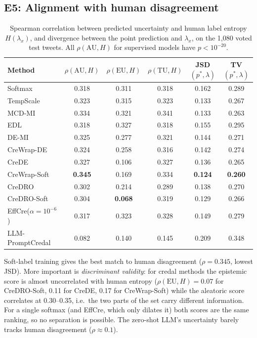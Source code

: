 \documentclass[11pt,a4paper]{article}
\newcommand{\TU}{\mathrm{TU}}
\newcommand{\AU}{\mathrm{AU}}
\newcommand{\EU}{\mathrm{EU}}
\newcommand{\best}[1]{\textbf{#1}}
\begin{document}
\subsection{E5: Alignment with human disagreement}

\begin{table}[h]
\centering\small
\begin{tabular}{l ccc cc}
\toprule
Method & $\rho(\AU,H)$ & $\rho(\EU,H)$ & $\rho(\TU,H)$ & JSD$(p^*,\lambda)$ & TV$(p^*,\lambda)$ \\
\midrule
Softmax & 0.318 & 0.311 & 0.318 & 0.162 & 0.289 \\
TempScale & 0.323 & 0.315 & 0.323 & 0.133 & 0.267 \\
MCD-MI & 0.334 & 0.321 & 0.341 & 0.133 & 0.263 \\
EDL & 0.318 & 0.327 & 0.318 & 0.155 & 0.295 \\
DE-MI & 0.325 & 0.277 & 0.321 & 0.144 & 0.271 \\
CreWrap-DE & 0.324 & 0.258 & 0.316 & 0.142 & 0.274 \\
CreDE & 0.327 & 0.106 & 0.327 & 0.136 & 0.265 \\
CreWrap-Soft & \best{0.345} & 0.169 & 0.334 & \best{0.124} & \best{0.260} \\
CreDRO & 0.302 & 0.214 & 0.289 & 0.138 & 0.270 \\
CreDRO-Soft & 0.304 & \best{0.068} & 0.319 & 0.129 & 0.266 \\
EffCre($\alpha{=}10^{-6}$) & 0.317 & 0.323 & 0.328 & 0.149 & 0.279 \\
LLM-PromptCredal & 0.082 & 0.140 & 0.145 & 0.209 & 0.348 \\
\bottomrule
\end{tabular}
\caption{Spearman correlation between predicted uncertainty and human label entropy $H(\lambda_x)$, and divergence between the point prediction and $\lambda_x$, on the 1{,}080 voted test tweets. All $\rho(\AU,H)$ for supervised models have $p<10^{-20}$.}
\label{tab:e5}
\end{table}

Soft-label training gives the best match to human disagreement ($\rho=0.345$, lowest JSD). More important is \emph{discriminant validity}: for credal methods the epistemic score is almost uncorrelated with human entropy ($\rho(\EU,H)=0.07$ for CreDRO-Soft, 0.11 for CreDE, 0.17 for CreWrap-Soft) while the aleatoric score correlates at 0.30--0.35, i.e.\ the two parts of the set carry different information. For a single softmax (and EffCre, which only dilates it) both scores are the same ranking, so no separation is possible. The zero-shot LLM's uncertainty barely tracks human disagreement ($\rho\approx0.1$).
\end{document}
